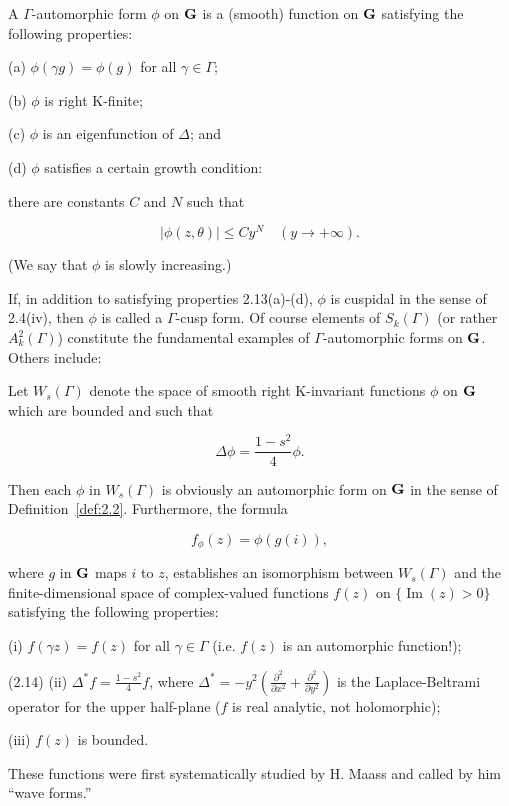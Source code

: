 \begin{definition}\label{def:2.2}

A $\Gamma$-automorphic form $\phi$ on $\mathbf{G}$ is a (smooth) function on $\mathbf{G}$ satisfying the following properties:

(a) $\phi(\gamma g) = \phi(g)$ for all $\gamma \in \Gamma$;

(b) $\phi$ is right K-finite;

(c) $\phi$ is an eigenfunction of $\Delta$; and

(d) $\phi$ satisfies a certain growth condition:

there are constants $C$ and $N$ such that

\begin{equation}\label{eq:2.13}
|\phi(z, \theta)| \leq Cy^{N} \quad (y \to +\infty).\tag{2.13}
\end{equation}

(We say that $\phi$ is slowly increasing.)

If, in addition to satisfying properties 2.13(a)-(d), $\phi$ is cuspidal in the sense of 2.4(iv), then $\phi$ is called a $\Gamma$-cusp form. Of course elements of $S_k(\Gamma)$ (or rather $A_k^2(\Gamma)$) constitute the fundamental examples of $\Gamma$-automorphic forms on $\mathbf{G}$. Others include:

\end{definition}

\begin{example}\label{exa:2.3}

Let $W_s(\Gamma)$ denote the space of smooth right K-invariant functions $\phi$ on $\mathbf{G}$ which are bounded and such that

\[
\Delta\phi = \frac{1 - s^2}{4}\phi.
\]

Then each $\phi$ in $W_s(\Gamma)$ is obviously an automorphic form on $\mathbf{G}$ in the sense of Definition~\ref{def:2.2}. Furthermore, the formula

\[
f_{\phi}(z) = \phi(g(i)),
\]

where $g$ in $\mathbf{G}$ maps $i$ to $z$, establishes an isomorphism between $W_s(\Gamma)$ and the finite-dimensional space of complex-valued functions $f(z)$ on $\{\operatorname{Im}(z) > 0\}$ satisfying the following properties:

(i) $f(\gamma z) = f(z)$ for all $\gamma \in \Gamma$ (i.e. $f(z)$ is an automorphic function!);

(2.14) (ii) $\Delta^{*}f = \frac{1 - s^2}{4}f$, where $\Delta^{*} = -y^2\left(\frac{\partial^2}{\partial x^2} + \frac{\partial^2}{\partial y^2}\right)$ is the Laplace-Beltrami operator for the upper half-plane ($f$ is real analytic, not holomorphic);

(iii) $f(z)$ is bounded.

These functions were first systematically studied by H. Maass and called by him ``wave forms.''

\end{example}

